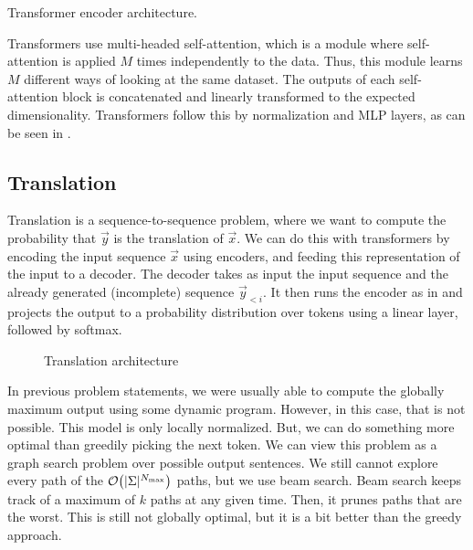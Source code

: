 \begin{marginfigure}
    \centering
    \caption{Transformer encoder architecture.}
    \label{fig:transformer}
\end{marginfigure}

Transformers \citep{vaswani2017attention} use multi-headed self-attention,
which is a module where self-attention is applied $M$ times independently to
the data. Thus, this module learns $M$ different ways of looking at the same
dataset. The outputs of each self-attention block is concatenated and linearly
transformed to the expected dimensionality. Transformers follow this by
normalization and MLP layers, as can be seen in .

\subsection{Translation}

Translation is a sequence-to-sequence problem, where we want to compute the
probability that $\vec{y}$ is the translation of $\vec{x}$. We can do this with
transformers by encoding the input sequence $\vec{x}$ using encoders, and
feeding this representation of the input to a decoder. The decoder takes as
input the input sequence and the already generated (incomplete) sequence
$\vec{y}_{<i}$. It then runs the encoder as in  and
projects the output to a probability distribution over tokens using a linear
layer, followed by softmax.

\begin{figure}[ht]
    \centering
    \caption{Translation architecture}
    \label{fig:translation-architecture}
\end{figure}

In previous problem statements, we were usually able to compute the globally
maximum output using some dynamic program. However, in this case, that is not
possible. This model is only locally normalized. But, we can do something more
optimal than greedily picking the next token. We can view this problem as a
graph search problem over possible output sentences. We still cannot explore
every path of the $\bigo{|\Sigma|^{N_{\max}}}$ paths, but we use beam search.
Beam search keeps track of a maximum of $k$ paths at any given time. Then, it
prunes paths that are the worst. This is still not globally optimal, but it is
a bit better than the greedy approach.
